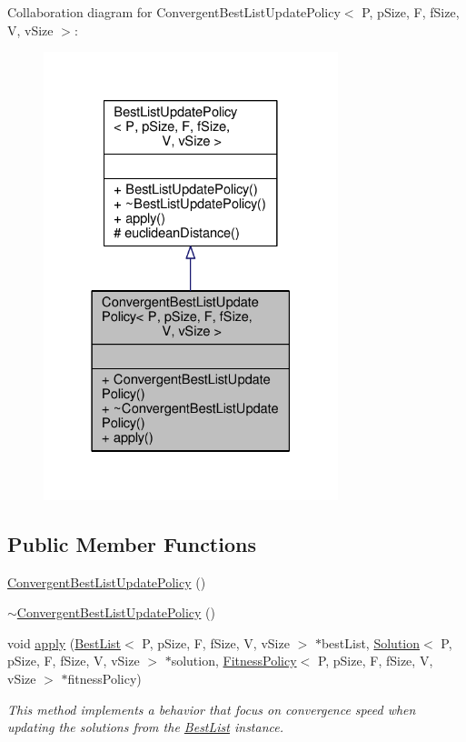 Collaboration diagram for Convergent\+Best\+List\+Update\+Policy$<$ P, p\+Size, F, f\+Size, V, v\+Size $>$\+:
\nopagebreak
\begin{figure}[H]
\begin{center}
\leavevmode
\includegraphics[width=243pt]{classConvergentBestListUpdatePolicy__coll__graph}
\end{center}
\end{figure}
\subsection*{Public Member Functions}
\begin{DoxyCompactItemize}
\item 
\hyperlink{classConvergentBestListUpdatePolicy_a3b4128e26d776ab760e1805beab61747}{Convergent\+Best\+List\+Update\+Policy} ()
\item 
\hyperlink{classConvergentBestListUpdatePolicy_ab965cc3715892b3a1be2559476b91791}{$\sim$\+Convergent\+Best\+List\+Update\+Policy} ()
\item 
void \hyperlink{classConvergentBestListUpdatePolicy_a6382937d32ac8bab7169f216fcd3048f}{apply} (\hyperlink{classBestList}{Best\+List}$<$ P, p\+Size, F, f\+Size, V, v\+Size $>$ $\ast$best\+List, \hyperlink{classSolution}{Solution}$<$ P, p\+Size, F, f\+Size, V, v\+Size $>$ $\ast$solution, \hyperlink{classFitnessPolicy}{Fitness\+Policy}$<$ P, p\+Size, F, f\+Size, V, v\+Size $>$ $\ast$fitness\+Policy)
\begin{DoxyCompactList}\small\item\em This method implements a behavior that focus on convergence speed when updating the solutions from the \hyperlink{classBestList}{Best\+List} instance. \end{DoxyCompactList}\end{DoxyCompactItemize}
